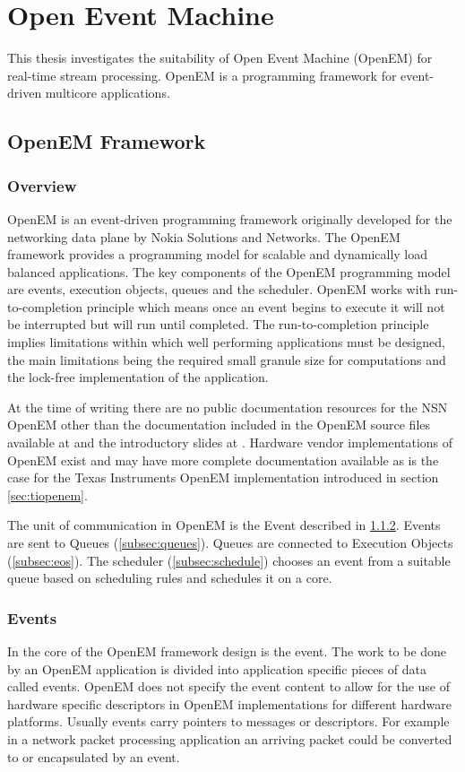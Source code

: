 \chapter{Open Event Machine}
\label{chapter:openem}
This thesis investigates the suitability of Open Event Machine (OpenEM) for
real-time stream processing. OpenEM is a programming framework for event-driven
multicore applications.

\section{OpenEM Framework}
\subsection{Overview}
OpenEM is an event-driven programming framework originally developed for the
networking data plane by Nokia Solutions and Networks. The OpenEM framework
provides a programming model for scalable and dynamically load balanced
applications. The key components of the OpenEM programming model are events,
execution objects, queues and the scheduler. OpenEM works with
run-to-completion principle which means once an event begins to execute it will
not be interrupted but will run until completed. The run-to-completion
principle implies limitations within which well performing applications must be
designed, the main limitations being the required small granule size for
computations and the lock-free implementation of the application.
\cite{openempage}

At the time of writing there are no public documentation resources for the NSN
OpenEM other than the documentation included in the OpenEM source files
available at \cite{openempage} and the introductory slides at
\cite{openemintro}. Hardware vendor implementations of OpenEM exist and may
have more complete documentation available as is the case for the Texas
Instruments OpenEM implementation introduced in section \ref{sec:tiopenem}.

The unit of communication in OpenEM is the Event described in
\ref{subsec:event}. Events are sent to Queues (\ref{subsec:queues}). Queues are
connected to Execution Objects (\ref{subsec:eos}). The scheduler
(\ref{subsec:schedule}) chooses an event from a suitable queue based on
scheduling rules and schedules it on a core.

\subsection{Events}
\label{subsec:event}
In the core of the OpenEM framework design is the event. The work to be done by
an OpenEM application is divided into application specific pieces of data
called events. OpenEM does not specify the event content to allow for the use
of hardware specific descriptors in OpenEM implementations for different
hardware platforms. Usually events carry pointers to messages or descriptors.
\cite{openemintro} For example in a network packet processing application an
arriving packet could be converted to or encapsulated by an event.

